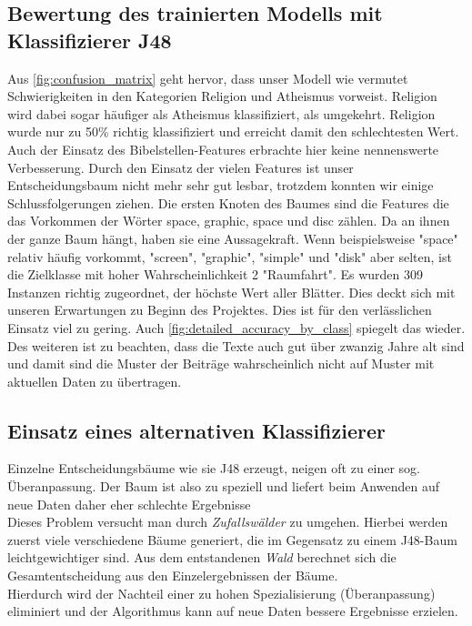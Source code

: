 \documentclass[
	11pt,
	a4paper
]{scrartcl}
\begin{document}
\subsection{Bewertung des trainierten Modells mit Klassifizierer J48}
Aus \autoref{fig:confusion_matrix} geht hervor, dass unser Modell wie vermutet Schwierigkeiten in den Kategorien Religion und Atheismus vorweist. 
Religion wird dabei sogar häufiger als Atheismus klassifiziert, als umgekehrt. 
Religion wurde nur zu 50\% richtig klassifiziert und erreicht damit den schlechtesten Wert. 
Auch der Einsatz des Bibelstellen-Features erbrachte hier keine nennenswerte
Verbesserung.
Durch den Einsatz der vielen Features ist unser Entscheidungsbaum nicht mehr sehr gut lesbar, trotzdem
konnten wir einige Schlussfolgerungen ziehen.
Die ersten Knoten des Baumes sind die Features die das Vorkommen der Wörter space, graphic, space
und disc zählen. Da an ihnen der ganze Baum hängt, haben sie eine Aussagekraft.
Wenn beispielsweise "space" relativ häufig vorkommt, "screen", "graphic", "simple" und "disk" aber selten, ist die Zielklasse mit hoher Wahrscheinlichkeit 2 "Raumfahrt". Es wurden 309 Instanzen richtig zugeordnet, der höchste Wert aller Blätter. Dies deckt sich mit unseren Erwartungen zu Beginn des Projektes.
Dies ist für den verlässlichen Einsatz viel zu gering.
Auch \autoref{fig:detailed_accuracy_by_class} spiegelt das wieder.
Des weiteren ist zu beachten, dass die Texte auch gut über zwanzig Jahre alt sind und damit sind die Muster der Beiträge wahrscheinlich nicht
auf Muster mit aktuellen Daten zu übertragen.

\subsection{Einsatz eines alternativen Klassifizierer}
Einzelne Entscheidungsbäume wie sie J48 erzeugt, neigen oft zu einer sog. Überanpassung. Der Baum ist also zu speziell und liefert beim
Anwenden auf neue Daten daher eher schlechte Ergebnisse\\

Dieses Problem versucht man durch \emph{Zufallswälder} zu umgehen. Hierbei werden zuerst viele verschiedene Bäume generiert, die im
Gegensatz zu einem J48-Baum leichtgewichtiger sind. Aus dem entstandenen \emph{Wald} berechnet sich die Gesamtentscheidung aus den
Einzelergebnissen der Bäume.\\
Hierdurch wird der Nachteil einer zu hohen Spezialisierung (Überanpassung) eliminiert und der
Algorithmus kann auf neue Daten bessere Ergebnisse erzielen.\\
\end{document}
